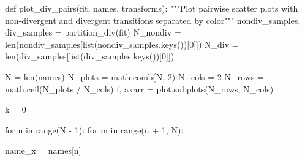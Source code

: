 \documentclass[
  letterpaper,
  DIV=11,
  numbers=noendperiod]{scrartcl}
\newenvironment{Shaded}{\begin{snugshade}}{\end{snugshade}}
\newcommand{\BuiltInTok}[1]{\textcolor[rgb]{0.00,0.23,0.31}{#1}}
\newcommand{\CommentTok}[1]{\textcolor[rgb]{0.37,0.37,0.37}{#1}}
\newcommand{\ControlFlowTok}[1]{\textcolor[rgb]{0.00,0.23,0.31}{#1}}
\newcommand{\DecValTok}[1]{\textcolor[rgb]{0.68,0.00,0.00}{#1}}
\newcommand{\KeywordTok}[1]{\textcolor[rgb]{0.00,0.23,0.31}{#1}}
\newcommand{\NormalTok}[1]{\textcolor[rgb]{0.00,0.23,0.31}{#1}}
\newcommand{\OperatorTok}[1]{\textcolor[rgb]{0.37,0.37,0.37}{#1}}
\begin{document}
\begin{Shaded}
\begin{Highlighting}[]
\KeywordTok{def}\NormalTok{ plot\_div\_pairs(fit, names, transforms):}
  \CommentTok{"""Plot pairwise scatter plots with non{-}divergent and divergent }
\CommentTok{     transitions separated by color"""}
\NormalTok{  nondiv\_samples, div\_samples }\OperatorTok{=}\NormalTok{ partition\_div(fit)}
\NormalTok{  N\_nondiv }\OperatorTok{=} \BuiltInTok{len}\NormalTok{(nondiv\_samples[}\BuiltInTok{list}\NormalTok{(nondiv\_samples.keys())[}\DecValTok{0}\NormalTok{]])}
\NormalTok{  N\_div }\OperatorTok{=} \BuiltInTok{len}\NormalTok{(div\_samples[}\BuiltInTok{list}\NormalTok{(div\_samples.keys())[}\DecValTok{0}\NormalTok{]])}
       
\NormalTok{  N }\OperatorTok{=} \BuiltInTok{len}\NormalTok{(names)}
\NormalTok{  N\_plots }\OperatorTok{=}\NormalTok{ math.comb(N, }\DecValTok{2}\NormalTok{)}
\NormalTok{  N\_cols }\OperatorTok{=} \DecValTok{2}
\NormalTok{  N\_rows }\OperatorTok{=}\NormalTok{ math.ceil(N\_plots }\OperatorTok{/}\NormalTok{ N\_cols)}
\NormalTok{  f, axarr }\OperatorTok{=}\NormalTok{ plot.subplots(N\_rows, N\_cols)}
  
\NormalTok{  k }\OperatorTok{=} \DecValTok{0}
  
  \ControlFlowTok{for}\NormalTok{ n }\KeywordTok{in} \BuiltInTok{range}\NormalTok{(N }\OperatorTok{{-}} \DecValTok{1}\NormalTok{):}
    \ControlFlowTok{for}\NormalTok{ m }\KeywordTok{in} \BuiltInTok{range}\NormalTok{(n }\OperatorTok{+} \DecValTok{1}\NormalTok{, N):}
        
\NormalTok{      name\_x }\OperatorTok{=}\NormalTok{ names[n]}
      

\end{Highlighting}
\end{Shaded}
\end{document}
